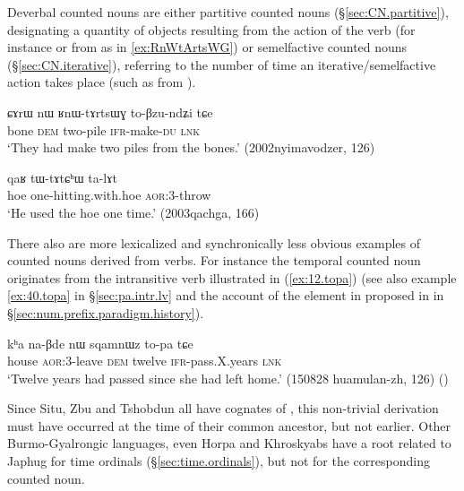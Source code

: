 Deverbal counted nouns are either partitive counted nouns (§\ref{sec:CN.partitive}), designating a quantity of objects resulting from the action of the verb (for instance  or  from  as in \ref{ex:RnWtArtsWG}) or semelfactive counted nouns (§\ref{sec:CN.iterative}), referring to the number of time an iterative/semelfactive action takes place (such as  from ).

\begin{exe}
\ex \label{ex:RnWtArtsWG}
\gll ɕɤrɯ nɯ ʁnɯ-tɤrtsɯɣ to-βzu-ndʑi tɕe \\
bone \textsc{dem} two-pile \textsc{ifr}-make-\textsc{du} \textsc{lnk} \\
\glt `They had make two piles from the bones.' (2002nyimavodzer, 126)
\end{exe}

\begin{exe}
\ex \label{ex:tWtAtChW}
\gll qaʁ tɯ-tɤtɕʰɯ ta-lɤt  \\
hoe one-hitting.with.hoe \textsc{aor}:3\flobv{}-throw \\
\glt `He used the hoe one time.' (2003qachga, 166)
\end{exe}

There also are more lexicalized and synchronically less obvious examples of counted nouns derived from verbs. For instance the temporal counted noun  originates from the intransitive verb   illustrated in (\ref{ex:12.topa}) (see also example \ref{ex:40.topa}  in §\ref{sec:pa.intr.lv} and the account of the  element in  proposed in in §\ref{sec:num.prefix.paradigm.history}). 

\begin{exe}
\ex \label{ex:12.topa} 
\gll kʰa na-βde nɯ sqamnɯz to-pa tɕe \\ 
house \textsc{aor}:3\flobv{}-leave \textsc{dem} twelve  \textsc{ifr}-pass.X.years \textsc{lnk} \\
\glt `Twelve years had passed since she had left home.' (150828 huamulan-zh, 126)
()
\end{exe}

Since Situ, Zbu and Tshobdun all have cognates of , this non-trivial derivation must have occurred at the time of their common ancestor, but not earlier. Other Burmo-Gyalrongic languages, even Horpa and Khroskyabs \citep{jacques17stau} have a root related to Japhug  for time ordinals (§\ref{sec:time.ordinals}), but not for the corresponding counted noun. 
  
